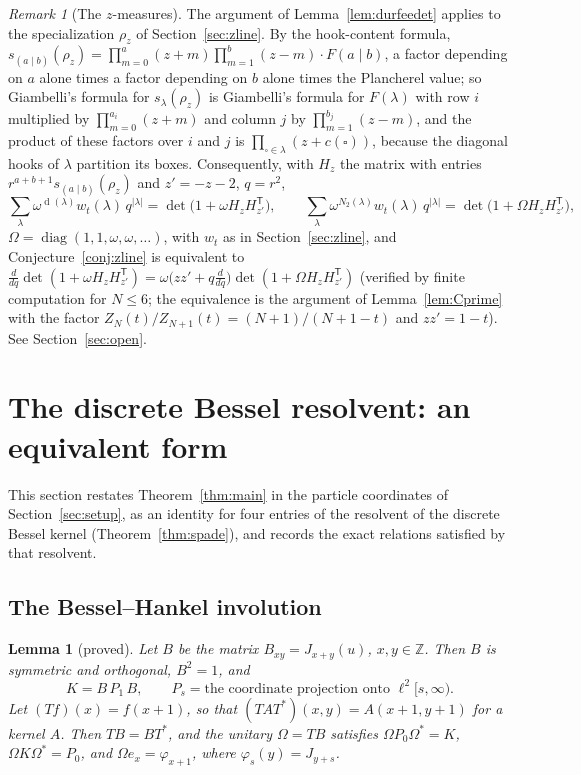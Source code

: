 \documentclass[11pt]{article}
\newtheorem{lemma}[theorem]{Lemma}
\theoremstyle{definition}
\theoremstyle{remark}
\newtheorem{remark}[theorem]{Remark}
\newcommand{\Z}{\mathbb{Z}}
\DeclareMathOperator{\Durfee}{d}
\begin{document}
\begin{remark}[The $z$-measures]\label{rem:giambelliz}
The argument of Lemma~\ref{lem:durfeedet} applies to the specialization $\rho_z$ of Section~\ref{sec:zline}. By the hook-content formula, $s_{(a\mid b)}(\rho_z)=\prod_{m=0}^{a}(z+m)\prod_{m=1}^{b}(z-m)\cdot F(a\mid b)$, a factor depending on $a$ alone times a factor depending on $b$ alone times the Plancherel value; so Giambelli's formula for $s_\lambda(\rho_z)$ is Giambelli's formula for $F(\lambda)$ with row $i$ multiplied by $\prod_{m=0}^{a_i}(z+m)$ and column $j$ by $\prod_{m=1}^{b_j}(z-m)$, and the product of these factors over $i$ and $j$ is $\prod_{\square\in\lambda}(z+c(\square))$, because the diagonal hooks of $\lambda$ partition its boxes. Consequently, with $H_z$ the matrix with entries $r^{a+b+1}s_{(a\mid b)}(\rho_z)$ and $z'=-z-2$, $q=r^2$,
\[
\sum_\lambda\omega^{\Durfee(\lambda)}w_t(\lambda)\,q^{|\lambda|}=\det\bigl(1+\omega H_zH_{z'}^{\mathsf T}\bigr),\qquad
\sum_\lambda\omega^{N_2(\lambda)}w_t(\lambda)\,q^{|\lambda|}=\det\bigl(1+\Omega H_zH_{z'}^{\mathsf T}\bigr),
\]
$\Omega=\operatorname{diag}(1,1,\omega,\omega,\dots)$, with $w_t$ as in Section~\ref{sec:zline}, and Conjecture~\ref{conj:zline} is equivalent to $\frac{d}{dq}\det(1+\omega H_zH_{z'}^{\mathsf T})=\omega\bigl(zz'+q\frac{d}{dq}\bigr)\det(1+\Omega H_zH_{z'}^{\mathsf T})$ (verified by finite computation for $N\le6$; the equivalence is the argument of Lemma~\ref{lem:Cprime} with the factor $Z_N(t)/Z_{N+1}(t)=(N+1)/(N+1-t)$ and $zz'=1-t$). See Section~\ref{sec:open}.
\end{remark}

\section{The discrete Bessel resolvent: an equivalent form}\label{sec:bessel}

This section restates Theorem~\ref{thm:main} in the particle coordinates of Section~\ref{sec:setup}, as an identity for four entries of the resolvent of the discrete Bessel kernel (Theorem~\ref{thm:spade}), and records the exact relations satisfied by that resolvent.

\subsection{The Bessel--Hankel involution}

\begin{lemma}[proved]\label{lem:hankel}
Let $B$ be the matrix $B_{xy}=J_{x+y}(u)$, $x,y\in\Z$. Then $B$ is symmetric and orthogonal, $B^2=1$, and
\[
K=B\,P_1\,B,\qquad P_s=\text{the coordinate projection onto }\ell^2[s,\infty).
\]
Let $(Tf)(x)=f(x+1)$, so that $(TAT^*)(x,y)=A(x+1,y+1)$ for a kernel $A$. Then $TB=BT^*$, and the unitary $\Omega=TB$ satisfies $\Omega P_0\Omega^*=K$, $\Omega K\Omega^*=P_0$, and $\Omega e_x=\varphi_{x+1}$, where $\varphi_s(y)=J_{y+s}$.
\end{lemma}
\end{document}
